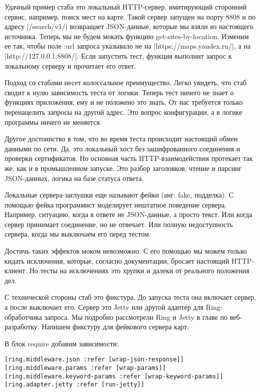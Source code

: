 Удачный пример стаба это локальный HTTP-сервер, имитирующий сторонний сервис,
например, поиск мест на карте. Такой сервер запущен на порту 8808 и по адресу
\spverb|/search/v1/| возвращает JSON-данные, которые мы взяли из настоящего
источника. Теперь мы не будем мокать функцию get-sites-by-location. Изменим ее
так, чтобы поле :url запроса указывало не на \spverb|https://maps.yandex.ru/|, а на
\spverb|http://127.0.0.1:8808/|. Если запустить тест, функция выполнит запрос к
локальному серверу и прочитает его ответ.

Подход со стабами несет колоссальное преимущество. Легко увидеть, что стаб
сводит к нулю зависимость теста от логики. Теперь тест ничего не знает о
функциях приложения; ему и не положено это знать. От нас требуется только
перенацелить запросы на другой адрес. Это вопрос конфигурации, а в логике
программы ничего не меняется.

Другое достоинство в том, что во время теста происходит настоящий обмен данными
по сети. Да, это локальный хост без зашифрованного соединения и проверки
сертификатов. Но основная часть HTTP-взаимодействия протекает так же, как и в
промышленном запуске. Это разбор заголовков, чтение и парсинг JSON-данных,
логика на базе статуса ответа.

Локальные сервера-заглушки еще называют фейки (анг. fake, подделка). С помощью
фейка программист моделирует нештатное поведение сервера. Например, ситуацию,
когда в ответе не JSON-данные, а просто текст. Или когда сервер принимает
соединение, но не отвечает. Или полную недоступность сервера, когда мы выключаем
его перед тестом.

Достичь таких эффектов моком невозможно. С его помощью мы можем только кидать
исключения, которые, согласно документации, бросает настоящий HTTP-клиент. Но
тесты на исключениях это хрупки и далеки от реального положения дел.

С технической стороны стаб это фикстура. До запуска теста она включает сервер, а
после выключает его. Сервер это Jetty или другой адаптер для Ring-обработчика
запроса. Мы подробно рассмотрели Ring и Jetty в главе по веб-разработку. Напишем
фикстуру для фейкового сервера карт.

В блок require добавим зависимости:

\begin{verbatim}
[ring.middleware.json :refer [wrap-json-response]]
[ring.middleware.params :refer [wrap-params]]
[ring.middleware.keyword-params :refer [wrap-keyword-params]]
[ring.adapter.jetty :refer [run-jetty]]
\end{verbatim}

